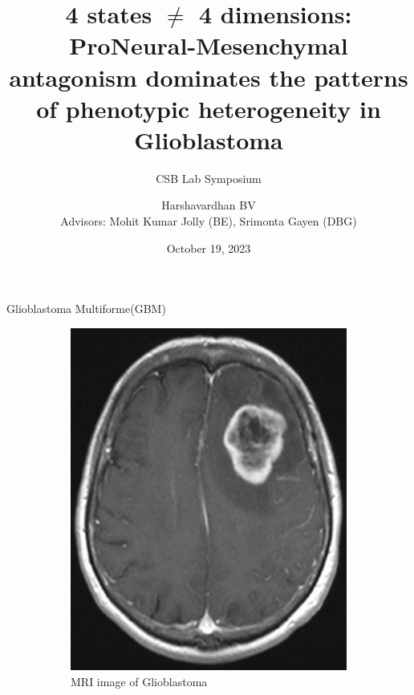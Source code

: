 \documentclass[aspectratio=169,9pt]{beamer}
\title{4 states $\neq$ 4 dimensions: ProNeural-Mesenchymal antagonism dominates the patterns of phenotypic heterogeneity in Glioblastoma}
\subtitle{CSB Lab Symposium}
\author{Harshavardhan BV \\ {\small Advisors: Mohit Kumar Jolly (BE), Srimonta Gayen (DBG)}}
\date{October 19, 2023}
\institute{IMI, IISc Bangalore}
\begin{document}
    \frame{\titlepage}

    \begin{frame}{Glioblastoma Multiforme(GBM)}
    \begin{adjustwidth}{-5cm}{-5cm}
            \centering
            \begin{figure}
                \centering
                \begin{subfigure}{0.35\textwidth}
                    \centering
                    \includegraphics[width=\textwidth]{GBM}
                    \caption{MRI image of Glioblastoma \footnotemark[1]}
                \end{subfigure}
                \pause
                \begin{subfigure}{0.25\textwidth}
                    \centering

\end{subfigure}
\end{figure}
\end{adjustwidth}
\end{frame}
\end{document}

